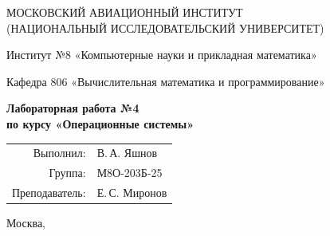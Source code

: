 \begin{titlepage}
\begin{center}
\large
МОСКОВСКИЙ АВИАЦИОННЫЙ ИНСТИТУТ\\
(НАЦИОНАЛЬНЫЙ ИССЛЕДОВАТЕЛЬСКИЙ УНИВЕРСИТЕТ)

\vspace{20pt}

Институт №8 «Компьютерные науки и прикладная математика»

Кафедра 806 «Вычислительная математика и программирование»
\end{center}

\vspace{60pt}

\begin{center}
\large\bfseries
Лабораторная работа №4\\
по курсу «Операционные системы»
\end{center}

\vfill

\begin{flushright}
\large
\begin{tabular}{rl}
Выполнил: & В.\,А. Яшнов \\
Группа: & М8О-203Б-25 \\
Преподаватель: & Е.\,С. Миронов \\
\end{tabular}
\end{flushright}

\vspace{92pt}

\begin{center}
\large
Москва, \the\year
\end{center}
\end{titlepage}
